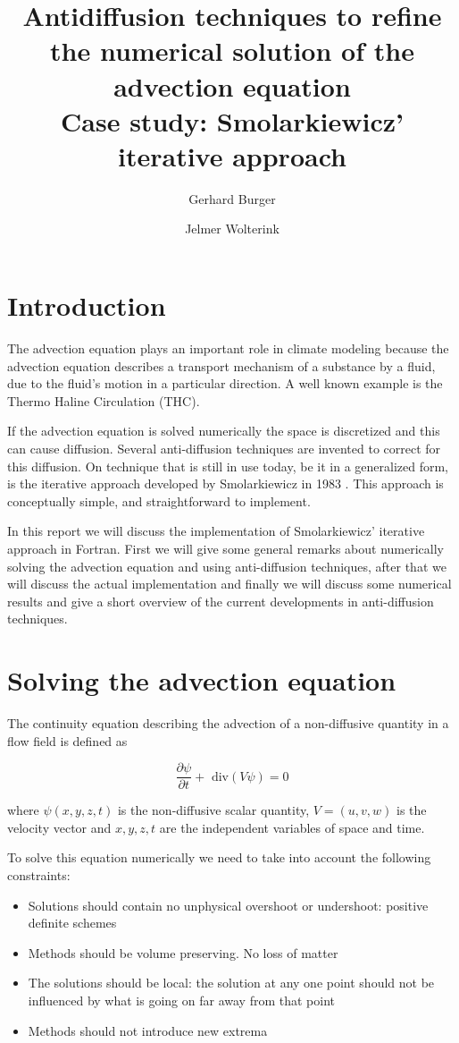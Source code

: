 \documentclass[12pt, a4paper]{article}
\author{Gerhard Burger \and Jelmer Wolterink}
\title{Antidiffusion techniques to refine the numerical solution of the advection equation\\ Case study: Smolarkiewicz' iterative approach}
\begin{document}
\maketitle

\section{Introduction}
The advection equation plays an important role in climate modeling because the advection equation describes a transport mechanism of a substance by a fluid, due to the fluid's motion in a particular direction.
A well known example is the Thermo Haline Circulation (THC).

If the advection equation is solved numerically the space is discretized and this can cause diffusion. Several anti-diffusion techniques are invented to correct for this diffusion. On technique that is still in use today, be it in a generalized form, is the iterative approach developed by Smolarkiewicz in 1983 \cite{smolarki}. This approach is conceptually simple, and straightforward to implement.

In this report we will discuss the implementation of Smolarkiewicz' iterative approach in Fortran. First we will give some general remarks about numerically solving the advection equation and using anti-diffusion techniques, after that we will discuss the actual implementation and finally we will discuss some numerical results and give a short overview of the current developments in anti-diffusion techniques.

\section{Solving the advection equation}
The continuity equation describing the advection of a non-diffusive quantity in a flow field is defined as

\begin{equation}
\frac{\partial \psi}{\partial t} + \text{ div}(V\psi) = 0
\end{equation}

where $\psi(x,y,z,t)$ is the non-diffusive scalar quantity, $V=(u,v,w)$ is the velocity vector and $x,y,z,t$ are the independent variables of space and time.

To solve this equation numerically we need to take into account the following constraints:

\begin{itemize}
\item Solutions should contain no unphysical overshoot or undershoot: positive definite schemes
\item Methods should be volume preserving. No loss of matter
\item The solutions should be local: the solution at any one point should not be influenced by what is going on far away from that point
\item Methods should not introduce new extrema
\end{itemize}
\end{document}

